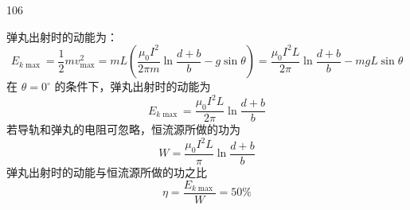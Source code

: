 \begin{solution}{106}
\begin{subsolution}
弹丸出射时的动能为：
\begin{equation}
E_{k\max} = \frac{1}{2} m v_{\max}^{2} = m L \left(\frac{\mu_{0} I^{2}}{2\pi m}\ln\frac{d+b}{b} - g\sin\theta\right) = \frac{\mu_{0} I^{2} L}{2\pi}\ln\frac{d+b}{b} - m g L \sin\theta
\label{eq:19.s106}
\end{equation}
在 $\theta = 0^{\circ}$ 的条件下，弹丸出射时的动能为
\begin{equation}
E_{k\max} = \frac{\mu_{0} I^{2} L}{2\pi}\ln\frac{d+b}{b}
\label{eq:20.s106}
\end{equation}
若导轨和弹丸的电阻可忽略，恒流源所做的功为
\begin{equation}
W = \frac{\mu_{0} I^{2} L}{\pi}\ln\frac{d+b}{b}
\label{eq:21.s106}
\end{equation}
弹丸出射时的动能与恒流源所做的功之比
\begin{equation}
\eta = \frac{E_{k\max}}{W} = 50\%
\label{eq:22.s106}
\end{equation}
\end{subsolution}
\end{solution}